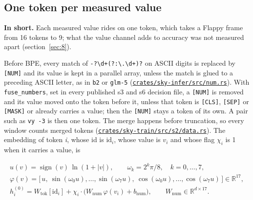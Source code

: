 \documentclass[10pt]{article}
\begin{document}
\subsection{One token per measured value}\label{sec:3.2}

\textbf{In short.} Each measured value rides on one token, which takes a Flappy frame from 16 tokens to 9; what the value channel adds to accuracy was not measured apart (section~\ref{sec:8}).

Before BPE, every match of \texttt{-?\textbackslash{}d+(?:\textbackslash{}.\textbackslash{}d+)?} on ASCII digits is replaced by \texttt{[NUM]} and its value is kept in a parallel array, unless the match is glued to a preceding ASCII letter, as in \texttt{b2} or \texttt{glm-5} (\href{https://github.com/maxgfr/skycmd/blob/main/crates/sky-infer/src/num.rs}{\texttt{crates/\allowbreak{}sky-infer/\allowbreak{}src/\allowbreak{}num.rs}}). With \texttt{fuse\_\allowbreak{}numbers}, set in every published s3 and s6 decision file, a \texttt{[NUM]} is removed and its value moved onto the token before it, unless that token is \texttt{[CLS]}, \texttt{[SEP]} or \texttt{[MASK]} or already carries a value; then the \texttt{[NUM]} stays a token of its own. A pair such as \texttt{vy -3} is then one token. The merge happens before truncation, so every window counts merged tokens (\href{https://github.com/maxgfr/skycmd/blob/main/crates/sky-train/src/s2/data.rs}{\texttt{crates/\allowbreak{}sky-train/\allowbreak{}src/\allowbreak{}s2/\allowbreak{}data.rs}}). The embedding of token \emph{i}, whose id is $\mathrm{id}_{i}$, whose value is $v_{i}$ and whose flag $\chi_{i}$ is 1 when it carries a value, is

\begin{equation}\label{eq:1}
\begin{gathered}
u(v) = \operatorname{sign}(v)\,\ln(1 + |v|), \qquad \omega_k = 2^k \pi / 8, \quad k = 0, \dots, 7,\\
\varphi(v) = \bigl[\, u,\ \sin(\omega_0 u), \dots, \sin(\omega_7 u),\ \cos(\omega_0 u), \dots, \cos(\omega_7 u) \,\bigr] \in \mathbb{R}^{17},\\
h^{(0)}_i = W_{\mathrm{tok}}[\mathrm{id}_i] + \chi_i \cdot \bigl( W_{\mathrm{num}}\, \varphi(v_i) + b_{\mathrm{num}} \bigr), \qquad W_{\mathrm{num}} \in \mathbb{R}^{d \times 17}.
\end{gathered}
\end{equation}
\end{document}
